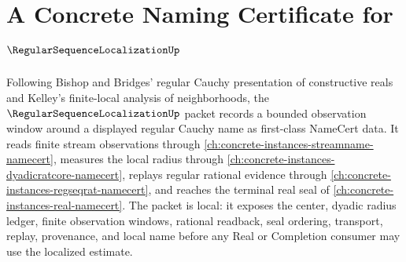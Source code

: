 \chapter{A Concrete Naming Certificate for $\RegularSequenceLocalizationUp$}
\label{ch:concrete-instances-regular-sequence-localization-namecert}

Following Bishop and Bridges' regular Cauchy presentation of constructive reals and Kelley's finite-local analysis of neighborhoods, the $\RegularSequenceLocalizationUp$ packet records a bounded observation window around a displayed regular Cauchy name as first-class NameCert data. It reads finite stream observations through \autoref{ch:concrete-instances-streamname-namecert}, measures the local radius through \autoref{ch:concrete-instances-dyadicratcore-namecert}, replays regular rational evidence through \autoref{ch:concrete-instances-regseqrat-namecert}, and reaches the terminal real seal of \autoref{ch:concrete-instances-real-namecert}. The packet is local: it exposes the center, dyadic radius ledger, finite observation windows, rational readback, seal ordering, transport, replay, provenance, and local name before any Real or Completion consumer may use the localized estimate.

